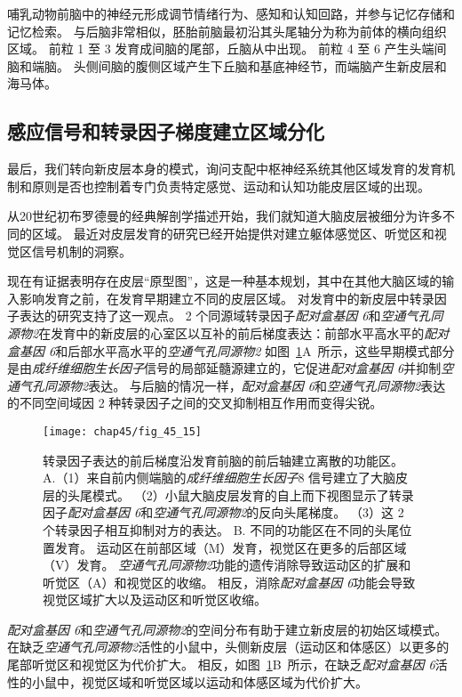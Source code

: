 哺乳动物前脑中的神经元形成调节情绪行为、感知和认知回路，并参与记忆存储和记忆检索。
与后脑非常相似，胚胎前脑最初沿其头尾轴分为称为前体的横向组织区域。
前粒 1 至 3 发育成间脑的尾部，丘脑从中出现。
前粒 4 至 6 产生头端间脑和端脑。
头侧间脑的腹侧区域产生下丘脑和基底神经节，而端脑产生新皮层和海马体。



\subsection{感应信号和转录因子梯度建立区域分化}

最后，我们转向新皮层本身的模式，询问支配中枢神经系统其他区域发育的发育机制和原则是否也控制着专门负责特定感觉、运动和认知功能皮层区域的出现。


从20世纪初布罗德曼的经典解剖学描述开始，我们就知道大脑皮层被细分为许多不同的区域。
最近对皮层发育的研究已经开始提供对建立躯体感觉区、听觉区和视觉区信号机制的洞察。


现在有证据表明存在皮层“原型图”，这是一种基本规划，其中在其他大脑区域的输入影响发育之前，在发育早期建立不同的皮层区域。
对发育中的新皮层中转录因子表达的研究支持了这一观点。
2 个同源域转录因子\textit{配对盒基因 6}和\textit{空通气孔同源物2}在发育中的新皮层的心室区以互补的前后梯度表达：前部水平高水平的\textit{配对盒基因 6}和后部水平高水平的\textit{空通气孔同源物2}
如图~\ref{fig:45_15}A~所示，这些早期模式部分是由\textit{成纤维细胞生长因子}信号的局部延髓源建立的，它促进\textit{配对盒基因 6}并抑制\textit{空通气孔同源物2}表达。
与后脑的情况一样，\textit{配对盒基因 6}和\textit{空通气孔同源物2}表达的不同空间域因 2 种转录因子之间的交叉抑制相互作用而变得尖锐。


\begin{figure}[htbp]
	\centering
	\texttt{[image: chap45/fig\_45\_15]}
	\caption{转录因子表达的前后梯度沿发育前脑的前后轴建立离散的功能区\cite{hamasaki2004emx2}。
		A.（1）来自前内侧端脑的\textit{成纤维细胞生长因子}8 信号建立了大脑皮层的头尾模式。
		（2）小鼠大脑皮层发育的自上而下视图显示了转录因子\textit{配对盒基因 6}和\textit{空通气孔同源物2}的反向头尾梯度。
		（3）这 2 个转录因子相互抑制对方的表达。
		B. 不同的功能区在不同的头尾位置发育。
		运动区在前部区域（M）发育，视觉区在更多的后部区域（V）发育。
		\textit{空通气孔同源物2}功能的遗传消除导致运动区的扩展和听觉区（A）和视觉区的收缩。
		相反，消除\textit{配对盒基因 6}功能会导致视觉区域扩大以及运动区和听觉区收缩。}
	\label{fig:45_15}
\end{figure}


\textit{配对盒基因 6}和\textit{空通气孔同源物2}的空间分布有助于建立新皮层的初始区域模式。
在缺乏\textit{空通气孔同源物2}活性的小鼠中，头侧新皮层（运动区和体感区）以更多的尾部听觉区和视觉区为代价扩大。
相反，如图~\ref{fig:45_15}B~所示，在缺乏\textit{配对盒基因 6}活性的小鼠中，视觉区域和听觉区域以运动和体感区域为代价扩大。


